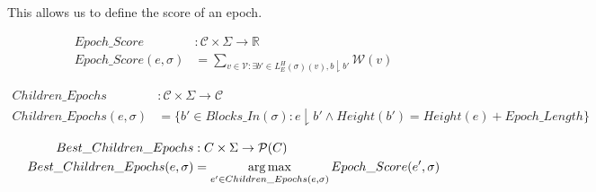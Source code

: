 This allows us to define the score of an epoch.
\begin{defn}
\begin{align*}
  Epoch\_Score&: \mathcal{C} \times \Sigma \to \mathbb{R} \\
  Epoch\_Score(e, \sigma) &= \sum_{v \in \mathcal{V} : \exists b' \in L^H_E(\sigma)(v), b \downharpoonright b'} \mathcal{W}(v)
\end{align*}
\end{defn}

\begin{defn}
\begin{align*}
  Children\_Epochs&: \mathcal{C} \times \Sigma \to \mathcal{C} \\
  Children\_Epochs(e, \sigma) &= \{b' \in Blocks\_In(\sigma): e \downharpoonright b' \land Height(b') = Height(e) + Epoch\_Length\}
\end{align*}
\end{defn}


\begin{defn}
\begin{align*}
Best\_Children\_Epochs&: C \times \Sigma \to \mathcal{P}(C)\\
Best\_Children\_Epochs(e, \sigma) &= \operatorname*{arg\,max}\limits_{e' \in Children\_Epochs(e, \sigma)} Epoch\_Score(e', \sigma)
\end{align*}
\end{defn}

